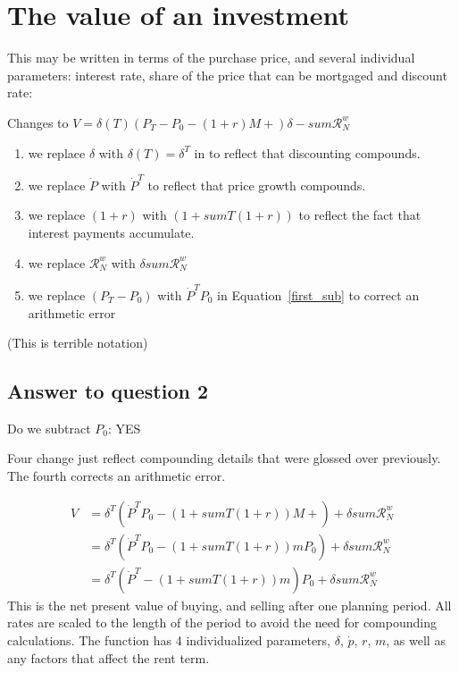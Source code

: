 \section{The value of an investment}
 
 This may be written in terms of the purchase price, and several individual parameters: interest  rate, share of the price that can be mortgaged and  discount rate: 

 Changes to $V = \delta(T) \left(P_T -P_0- (1+r)M + \right)  \delta-sum\mathcal{R}^w_N $\begin{enumerate}
     \item we replace $\delta$ with $\delta(T) = \delta^T$ in  to reflect that discounting compounds. 
     \item we replace $\dot P$ with $\dot P^T$ to reflect that price growth compounds. 
     \item we replace $(1+r)$ with $(1 + sumT(1+r))$ to reflect the fact that interest payments accumulate.  
     \item we replace $\mathcal{R}^w_N$ with $\delta sum\mathcal{R}^w_N$
     \item we replace $(P_T - P_0)$ with $\dot P^T P_0$ in Equation~\ref{first_sub} to correct an arithmetic error
 \end{enumerate} 
(This is terrible notation)
\subsection{Answer to question 2} 
Do we subtract $P_0$: YES 

Four change just reflect compounding details that were glossed over previously. The fourth corrects an arithmetic error.

\begin{align}
V &= \delta^T \left(\dot P^T P_0- (1 + sumT(1+r))M +  \right) +\delta sum\mathcal{R}^w_N   \\
&= \delta^T \left(\dot P^T P_0 - (1 + sumT(1+r))mP_0\right)  +      \delta sum\mathcal{R}^w_N \label{first_sub}\\
  &= \delta^T \left(\dot P^T    - (1 + sumT(1+r))m    \right) P_0 + \delta sum\mathcal{R}^w_N 
\end{align}
This is the net present value of buying, and selling after one planning period. All rates are scaled to the length of the period to avoid the need for compounding calculations. The function has 4 individualized  parameters, $\delta$, $\dot p$, $r$, $m$, as well as any factors that affect the rent term.


